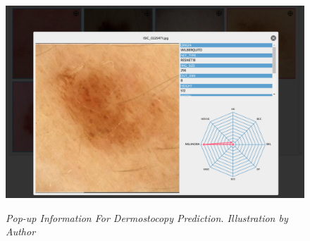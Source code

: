 \begin{figure}[H]
  \centering
  \includegraphics[width=\textwidth]{imatges/results/extra-inf-popup.png}
  \caption[Pop-up Information For Dermostocopy Prediction]{\textit{Pop-up Information For Dermostocopy Prediction. Illustration by Author}}
  {\label{fig:extra-inf-popup}}
\end{figure}
